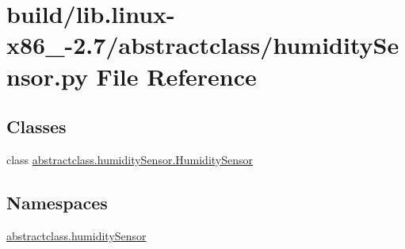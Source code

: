\hypertarget{build_2lib_8linux-x86__64-2_87_2abstractclass_2humiditySensor_8py}{}\section{build/lib.linux-\/x86\+\_-\/2.7/abstractclass/humidity\+Sensor.py File Reference}
\label{build_2lib_8linux-x86__64-2_87_2abstractclass_2humiditySensor_8py}
\subsection*{Classes}
\begin{DoxyCompactItemize}
\item 
class \hyperlink{classabstractclass_1_1humiditySensor_1_1HumiditySensor}{abstractclass.\+humidity\+Sensor.\+Humidity\+Sensor}
\end{DoxyCompactItemize}
\subsection*{Namespaces}
\begin{DoxyCompactItemize}
\item 
 \hyperlink{namespaceabstractclass_1_1humiditySensor}{abstractclass.\+humidity\+Sensor}
\end{DoxyCompactItemize}
